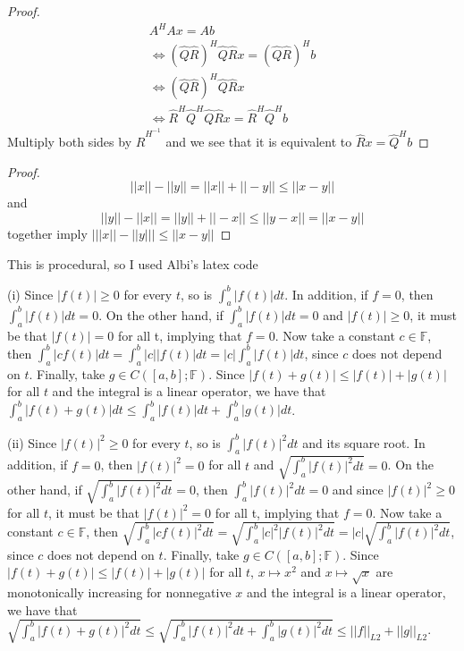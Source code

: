 \documentclass[12pt]{article}
\newenvironment{problem}[2][Problem]{\begin{trivlist}
\item[\hskip \labelsep {\bfseries #1}\hskip \labelsep {\bfseries #2.}]}{\end{trivlist}}
\theoremstyle{definition}
\theoremstyle{definition}
\theoremstyle{definition}
\theoremstyle{definition}
\begin{document}
\begin{problem}{3.17} \begin{proof}
\begin{align*}
A^HAx = Ab \\
\iff (\hat{Q} \hat{R})^H \hat{Q} \hat{R} x = (\hat{Q}\hat{R})^H b \\
\iff (\hat{Q} \hat{R})^H \hat{Q} \hat{R} x \\
\iff \hat{R}^H \hat{Q}^H \hat{Q} \hat{R} x = \hat{R}^H \hat{Q}^Hb
\end{align*}
Multiply both sides by $\hat{R}^{H^{-1}}$ and we see that it is equivalent to $\hat{R}x = \hat{Q}^Hb$
\end{proof}
\end{problem}

\begin{problem}{3.23}
\begin{proof}
$$||x|| - ||y|| = ||x||+ ||-y|| \leq ||x-y|| $$ and 
$$||y|| - ||x|| = ||y||+ ||-x|| \leq ||y-x|| = ||x-y||$$
together imply
$\big| ||x|| - ||y|| \big| \leq ||x-y|| $
\end{proof}
\end{problem}

\begin{problem}{3.24}This is procedural, so I used Albi's latex code
\end{problem}
(i)
Since $|f(t)|\geq 0$ for every $t$, so is $\int_a^b|f(t)|dt$.
In addition, if $f=0$, then $\int_a^b|f(t)|dt=0$.
On the other hand, if $\int_a^b|f(t)|dt=0$ and $|f(t)|\geq 0$, it must be that
$|f(t)|=0$ for all t, implying that $f=0$.
Now take a constant $c\in\mathbb F$, then 
$\int_a^b|cf(t)|dt=\int_a^b|c||f(t)|dt=|c|\int_a^b|f(t)|dt$,
since $c$ does not depend on $t$.
Finally, take $g\in C([a, b]; \mathbb F)$.
Since $|f(t)+g(t)|\leq|f(t)|+|g(t)|$ for all $t$ and the integral is a linear operator,
we have that $\int_a^b|f(t)+g(t)|dt\leq\int_a^b|f(t)|dt + \int_a^b|g(t)|dt$.

(ii)
Since $|f(t)|^2\geq 0$ for every $t$, so is $\int_a^b|f(t)|^2dt$ and its square root.
In addition, if $f=0$, then $|f(t)|^2=0$ for all $t$ and $\sqrt{\int_a^b|f(t)|^2dt}=0$.
On the other hand, if $\sqrt{\int_a^b|f(t)|^2dt}=0$, 
then $\int_a^b|f(t)|^2dt=0$ and since $|f(t)|^2\geq 0$ for all $t$, 
it must be that $|f(t)|^2=0$ for all t, implying that $f=0$.
Now take a constant $c\in\mathbb F$, then 
$\sqrt{\int_a^b|cf(t)|^2dt}=\sqrt{\int_a^b|c|^2|f(t)|^2dt}=|c|\sqrt{\int_a^b|f(t)|^2dt}$,
since $c$ does not depend on $t$.
Finally, take $g\in C([a, b]; \mathbb F)$.
Since $|f(t)+g(t)|\leq|f(t)|+|g(t)|$ for all $t$, 
$x\mapsto x^2$ and $x\mapsto\sqrt{x}$ are monotonically increasing for nonnegative $x$ 
and the integral is a linear operator,
we have that $\sqrt{\int_a^b|f(t)+g(t)|^2dt}\leq\sqrt{\int_a^b|f(t)|^2dt + \int_a^b|g(t)|^2dt}
\leq||f||_{L2}+||g||_{L2}$.
\end{document}

